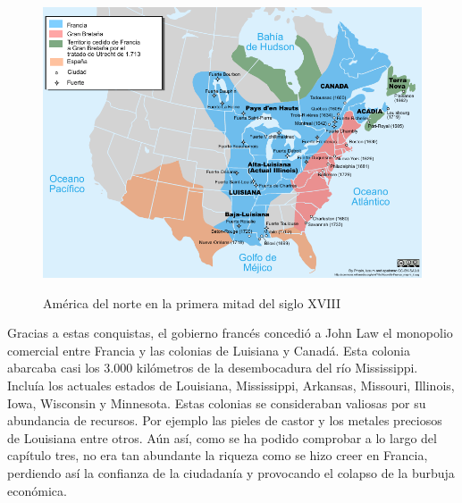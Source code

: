 \begin{figure}[!h] 
	\caption{América del norte en la primera mitad del siglo XVIII} 
	\centering
	\includegraphics[width=140mm]{capitulos/img/louisiana} 
	\label{fig:louisiana} 
\end{figure}
 
Gracias a estas conquistas, el gobierno francés concedió a John Law el monopolio comercial entre Francia y las colonias de Luisiana y Canadá. Esta colonia abarcaba casi los 3.000 kilómetros de la desembocadura del río Mississippi. Incluía los actuales estados de Louisiana, Mississippi, Arkansas, Missouri, Illinois, Iowa, Wisconsin y Minnesota. Estas colonias se consideraban valiosas por su abundancia de recursos. Por ejemplo las pieles de castor y los metales preciosos de Louisiana entre otros. Aún así, como se ha podido comprobar a lo largo del capítulo tres, no era tan abundante la riqueza como se hizo creer en Francia, perdiendo así la confianza de la ciudadanía y provocando el colapso de la burbuja económica.

